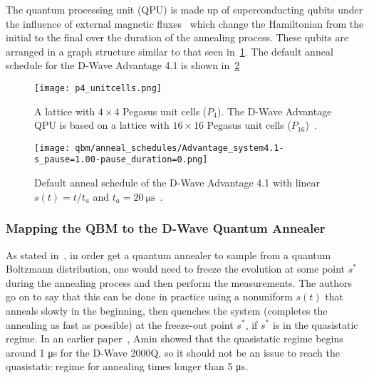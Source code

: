 The quantum processing unit (QPU) is made up of superconducting qubits under the influence of external magnetic fluxes~\cite{qc_lecture_notes} which change the Hamiltonian from the initial to the final over the duration of the annealing process.
These qubits are arranged in a graph structure similar to that seen in~\cref{fig:p4_unitcells}.
The default anneal schedule for the D-Wave Advantage 4.1 is shown in~\cref{fig:anneal_schedule_default}
\begin{figure}[!htb]
    \begin{center}
        \texttt{[image: p4\_unitcells.png]}
    \end{center}
    \caption{
        A lattice with \( 4 \times 4 \) Pegasus unit cells (\( P_4 \)).
        The D-Wave Advantage QPU is based on a lattice with \( 16 \times 16 \) Pegasus unit cells (\( P_{16} \))~\cite{dwave_topologies}.
    }
    \label{fig:p4_unitcells}
\end{figure}
\begin{figure}[!htb]
    \begin{center}
        \texttt{[image: qbm/anneal\_schedules/Advantage\_system4.1-s\_pause=1.00-pause\_duration=0.png]}
    \end{center}
    \caption{
        Default anneal schedule of the D-Wave Advantage 4.1 with linear \( s(t) = t / t_a \) and \( t_a = 20 \ \si{\micro\second} \)~\cite{dwave_anneal_schedules}.
    }
    \label{fig:anneal_schedule_default}
\end{figure}

\subsubsection{Mapping the QBM to the D-Wave Quantum Annealer}
As stated in~\cite{amin_2018}, in order get a quantum annealer to sample from a quantum Boltzmann distribution, one would need to freeze the evolution at some point \( s^* \) during the annealing process and then perform the measurements.
The authors go on to say that this can be done in practice using a nonuniform \( s(t) \) that anneals slowly in the beginning, then quenches the system (completes the annealing as fast as possible) at the freeze-out point \( s^* \), if \( s^* \) is in the quasistatic regime.
In an earlier paper~\cite{amin_2015}, Amin showed that the quasistatic regime begins around 1 \si{\micro\second} for the D-Wave 2000Q, so it should not be an issue to reach the quasistatic regime for annealing times longer than 5 \si{\micro\second}.

